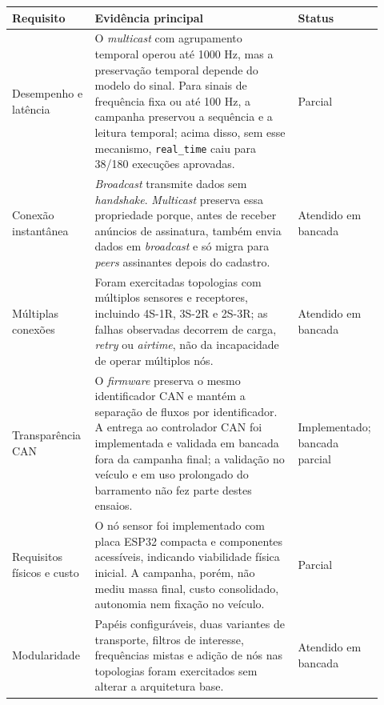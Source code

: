 \begin{center}
\scriptsize
\setlength{\tabcolsep}{3pt}
\renewcommand{\arraystretch}{1.12}
\begin{tabular}{p{0.22\linewidth}|p{0.54\linewidth}|p{0.16\linewidth}}
\hline
Requisito & Evidência principal & Status \\
\hline
Desempenho e latência & O \emph{multicast} com agrupamento temporal operou até 1000 Hz, mas a preservação temporal depende do modelo do sinal. Para sinais de frequência fixa ou até 100 Hz, a campanha preservou a sequência e a leitura temporal; acima disso, sem esse mecanismo, \texttt{real\_time} caiu para 38/180 execuções aprovadas. & Parcial \\
\hline
Conexão instantânea & \emph{Broadcast} transmite dados sem \emph{handshake}. \emph{Multicast} preserva essa propriedade porque, antes de receber anúncios de assinatura, também envia dados em \emph{broadcast} e só migra para \emph{peers} assinantes depois do cadastro. & Atendido em bancada \\
\hline
Múltiplas conexões & Foram exercitadas topologias com múltiplos sensores e receptores, incluindo 4S-1R, 3S-2R e 2S-3R; as falhas observadas decorrem de carga, \emph{retry} ou \emph{airtime}, não da incapacidade de operar múltiplos nós. & Atendido em bancada \\
\hline
Transparência CAN & O \emph{firmware} preserva o mesmo identificador CAN e mantém a separação de fluxos por identificador. A entrega ao controlador CAN foi implementada e validada em bancada fora da campanha final; a validação no veículo e em uso prolongado do barramento não fez parte destes ensaios. & Implementado; bancada parcial \\
\hline
Requisitos físicos e custo & O nó sensor foi implementado com placa ESP32 compacta e componentes acessíveis, indicando viabilidade física inicial. A campanha, porém, não mediu massa final, custo consolidado, autonomia nem fixação no veículo. & Parcial \\
\hline
Modularidade & Papéis configuráveis, duas variantes de transporte, filtros de interesse, frequências mistas e adição de nós nas topologias foram exercitados sem alterar a arquitetura base. & Atendido em bancada \\
\hline
\end{tabular}
\label{tab:rastreabilidade-requisitos}
\end{center}

